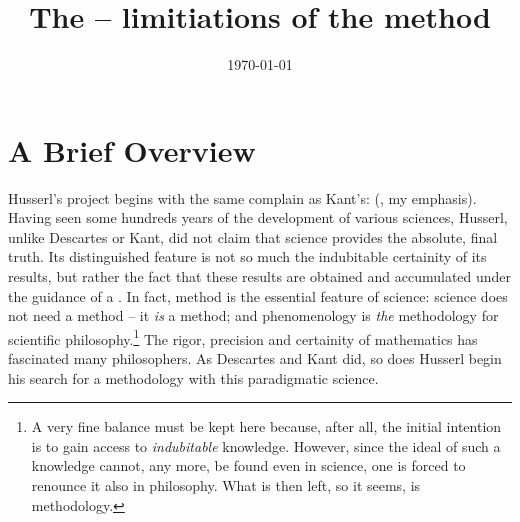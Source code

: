 \title{The   -- limitiations of the method}
\author{ }

\date{\hfill\small\today}  %
\maketitle \vspace*{-3ex}

\section{A Brief Overview}\label{sec:over}

Husserl's project begins with the same complain as Kant's: 
 (\cite{RS}, my emphasis).
Having seen some hundreds years of the development of 
various sciences, Husserl, unlike Descartes or Kant, did not claim
that science 
provides the absolute, final truth. Its distinguished feature is not so much the 
indubitable certainity of its results, but rather the fact that these 
results are obtained and accumulated under the guidance of a . 
In fact, method is the essential feature of science:
science does not need a method -- it {\em is} a method; and 
phenomenology is {\em the} methodology for scientific 
philosophy.\footnote{A very fine balance must be kept here because, after all, the 
initial intention is to gain access to {\em indubitable} knowledge. 
However, since the ideal of such a knowledge cannot, any more, be 
found 
even in science, one is forced to renounce it also in philosophy. 
What is then left, so it seems, is methodology.}
The rigor, precision and certainity of mathematics has fascinated many philosophers.
As Descartes and Kant did, so does Husserl begin his search for 
a methodology with this paradigmatic science. 


